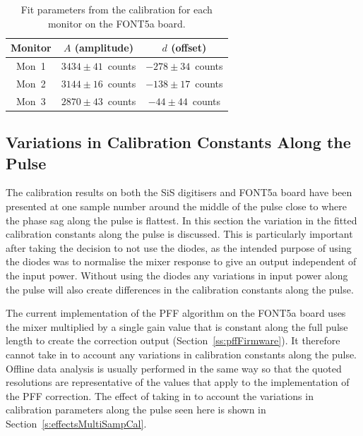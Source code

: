\begin{table}
  \begin{center}
    \begin{tabular}{|c c c|}
	   \hline
       Monitor & \(A\) (amplitude) & \(d\) (offset) \\ \hline
       Mon~1 & \(3434\pm41\)~counts & \(-278\pm34\)~counts \\ 
       Mon~2 & \(3144\pm16\)~counts & \(-138\pm17\)~counts\\
       Mon~3 & \(2870\pm43\)~counts & \(-44\pm44\)~counts\\ \hline
    \end{tabular}
    \caption{Fit parameters from the calibration for each monitor on the FONT5a board.}
  	\label{t:calFONTConsts}
  \end{center}
\end{table}

\subsection{Variations in Calibration Constants Along the Pulse}
\label{ss:calMultiSamp}

The calibration results on both the SiS digitisers and FONT5a board have been presented at one sample number around the middle of the pulse close to where the phase sag along the pulse is flattest. In this section the variation in the fitted calibration constants along the pulse is discussed. This is particularly important after taking the decision to not use the diodes, as the intended purpose of using the diodes was to normalise the mixer response to give an output independent of the input power. Without using the diodes any variations in input power along the pulse will also create differences in the calibration constants along the pulse. 

The current implementation of the PFF algorithm on the FONT5a board uses the mixer multiplied by a single gain value that is constant along the full pulse length to create the correction output (Section~\ref{ss:pffFirmware}). It therefore cannot take in to account any variations in calibration constants along the pulse. Offline data analysis is usually performed in the same way so that the quoted resolutions are representative of the values that apply to the implementation of the PFF correction. The effect of taking in to account the variations in calibration parameters along the pulse seen here is shown in Section~\ref{s:effectsMultiSampCal}.

